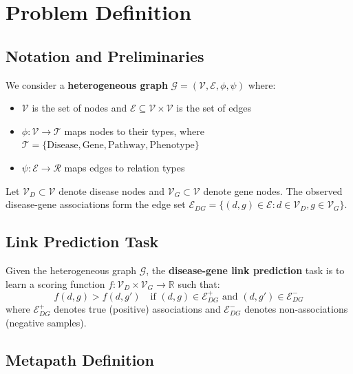 \documentclass{article}
\newcommand{\set}[1]{\mathcal{#1}}
\newcommand{\real}{\mathbb{R}}
\begin{document}
\section{Problem Definition}
\label{sec:problem}

\subsection{Notation and Preliminaries}

We consider a \textbf{heterogeneous graph} $\set{G} = (\set{V}, \set{E}, \phi, \psi)$ where:
\begin{itemize}
    \item $\set{V}$ is the set of nodes and $\set{E} \subseteq \set{V} \times \set{V}$ is the set of edges
    \item $\phi: \set{V} \rightarrow \set{T}$ maps nodes to their types, where $\set{T} = \{\text{Disease}, \text{Gene}, \text{Pathway}, \text{Phenotype}\}$
    \item $\psi: \set{E} \rightarrow \set{R}$ maps edges to relation types
\end{itemize}

Let $\set{V}_D \subset \set{V}$ denote disease nodes and $\set{V}_G \subset \set{V}$ denote gene nodes. The observed disease-gene associations form the edge set $\set{E}_{DG} = \{(d, g) \in \set{E} : d \in \set{V}_D, g \in \set{V}_G\}$.

\subsection{Link Prediction Task}

Given the heterogeneous graph $\set{G}$, the \textbf{disease-gene link prediction} task is to learn a scoring function $f: \set{V}_D \times \set{V}_G \rightarrow \real$ such that:
\begin{equation}
    f(d, g) > f(d, g') \quad \text{if } (d,g) \in \set{E}_{DG}^+ \text{ and } (d,g') \in \set{E}_{DG}^-
\end{equation}
where $\set{E}_{DG}^+$ denotes true (positive) associations and $\set{E}_{DG}^-$ denotes non-associations (negative samples).

\subsection{Metapath Definition}
\end{document}
